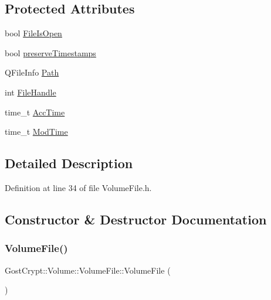 \subsection*{Protected Attributes}
\begin{DoxyCompactItemize}
\item 
bool \hyperlink{class_gost_crypt_1_1_volume_1_1_volume_file_afc00f2ab655368fc1e2e90c25560c8f1}{File\+Is\+Open}
\item 
bool \hyperlink{class_gost_crypt_1_1_volume_1_1_volume_file_a8c6dc4712abe9ba03348af5938d200cb}{preserve\+Timestamps}
\item 
Q\+File\+Info \hyperlink{class_gost_crypt_1_1_volume_1_1_volume_file_a74be68b4c6a8ddb438acf797f26095a2}{Path}
\item 
int \hyperlink{class_gost_crypt_1_1_volume_1_1_volume_file_a85dd587cf0713856a8efd40f989c815c}{File\+Handle}
\item 
time\+\_\+t \hyperlink{class_gost_crypt_1_1_volume_1_1_volume_file_a55769a7bd1db1aa3786e4f5faa1ecb47}{Acc\+Time}
\item 
time\+\_\+t \hyperlink{class_gost_crypt_1_1_volume_1_1_volume_file_af2ded515d54667c3d9852da600341042}{Mod\+Time}
\end{DoxyCompactItemize}


\subsection{Detailed Description}


Definition at line 34 of file Volume\+File.\+h.



\subsection{Constructor \& Destructor Documentation}
\mbox{\label{class_gost_crypt_1_1_volume_1_1_volume_file_a0860f8aae0794efc7e45e420de19221c}} 
\subsubsection{\texorpdfstring{Volume\+File()}{VolumeFile()}}
{\footnotesize\ttfamily Gost\+Crypt\+::\+Volume\+::\+Volume\+File\+::\+Volume\+File (\begin{DoxyParamCaption}{ }\end{DoxyParamCaption})\hspace{0.3cm}{\ttfamily [inline]}}



